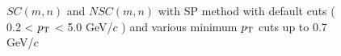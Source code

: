 	\begin{figure}[htbp]
            \begin{center}
              \end{center}
              \caption{$SC(m,n)$ and $NSC(m,n)$ with SP method with default cuts ( 0.2 < $p_{\rm{T}}$ < 5.0 GeV/$c$ ) and various minimum $p_{\rm{T}}$ cuts up to 0.7 GeV/$c$ }
              \label{fig:SC_pt_withSP_lower}
       \end{figure}


